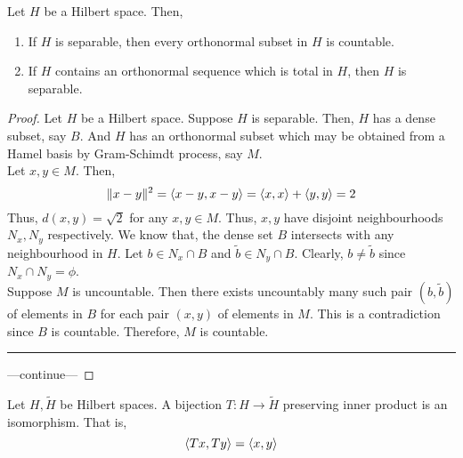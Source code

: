 \begin{theorem}
	Let $H$ be a Hilbert space.
	Then,
	\begin{enumerate}
		\item If $H$ is separable, then every orthonormal subset in $H$ is countable.
		\item If $H$ contains an orthonormal sequence which is total in $H$, then $H$ is separable.
	\end{enumerate}
\end{theorem}
\begin{proof}
	Let $H$ be a Hilbert space.
	Suppose $H$ is separable.
	Then, $H$ has a dense subset, say $B$.
	And $H$ has an orthonormal subset which may be obtained from a Hamel basis by Gram-Schimdt process, say $M$.\\
	
	Let $x,y \in M$.
	Then,
	\[ \|x-y\|^2 = \left\langle x-y,x-y \right\rangle = \left\langle x,x \right\rangle + \left\langle y,y \right\rangle = 2 \]
	Thus, $d(x,y) = \sqrt{2}$ for any $x,y \in M$.
	Thus, $x,y$ have disjoint neighbourhoods $N_x,N_y$ respectively.
	We know that, the dense set $B$ intersects with any neighbourhood in $H$.
	Let $b \in N_x \cap B$ and $\tilde{b} \in N_y \cap B$.
	Clearly, $b \ne \tilde{b}$ since $N_x \cap N_y = \phi$.\\

	Suppose $M$ is uncountable.
	Then there exists uncountably many such pair $(b,\tilde{b})$ of elements in $B$ for each pair $(x,y)$ of elements in $M$.
	This is a contradiction since $B$ is countable.
	Therefore, $M$ is countable.\\

	\hrule \vspace{1em}

	---continue---
\end{proof}

\begin{definition}[isomorphism]
	Let $H,\tilde{H}$ be Hilbert spaces.
	A bijection $T : H \to \tilde{H}$ preserving inner product is an isomorphism.
	That is, 
	\[ \left\langle Tx,Ty \right\rangle = \left\langle x,y \right\rangle \]
\end{definition}

